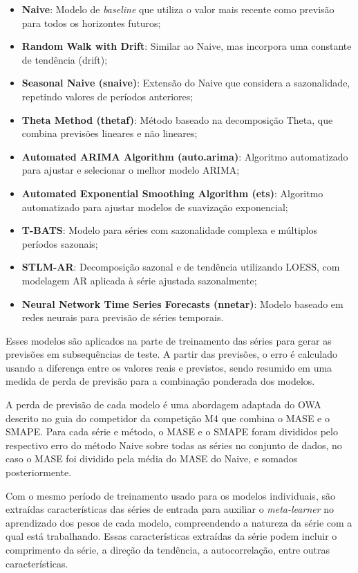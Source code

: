 \begin{itemize}
\label{pool_models}
    \item \textbf{Naive}: Modelo de \textit{baseline} que utiliza o valor mais recente como previsão para todos os horizontes futuros;
    \item \textbf{Random Walk with Drift}: Similar ao Naive, mas incorpora uma constante de tendência (drift);
    \item \textbf{Seasonal Naive (snaive)}: Extensão do Naive que considera a sazonalidade, repetindo valores de períodos anteriores;
    \item \textbf{Theta Method (thetaf)}: Método baseado na decomposição Theta, que combina previsões lineares e não lineares;
    \item \textbf{Automated ARIMA Algorithm (auto.arima)}: Algoritmo automatizado para ajustar e selecionar o melhor modelo ARIMA;
    \item \textbf{Automated Exponential Smoothing Algorithm (ets)}: Algoritmo automatizado para ajustar modelos de suavização exponencial;
    \item \textbf{T-BATS}: Modelo para séries com sazonalidade complexa e múltiplos períodos sazonais;
    \item \textbf{STLM-AR}: Decomposição sazonal e de tendência utilizando LOESS, com modelagem AR aplicada à série ajustada sazonalmente;
    \item \textbf{Neural Network Time Series Forecasts (nnetar)}: Modelo baseado em redes neurais para previsão de séries temporais.
\end{itemize}

Esses modelos são aplicados na parte de treinamento das séries para gerar as previsões em subsequências de teste. A partir das previsões, o erro é calculado usando a diferença entre os valores reais e previstos, sendo resumido em uma medida de perda de previsão para a combinação ponderada dos modelos.

A perda de previsão de cada modelo é uma abordagem adaptada do OWA descrito no guia do competidor da competição M4 \cite{m4competition} que combina o MASE e o SMAPE. Para cada série e método, o MASE e o SMAPE foram divididos pelo respectivo erro do método Naive sobre todas as séries no conjunto de dados, no caso o MASE foi dividido pela média do MASE do Naive, e somados posteriormente.

Com o mesmo período de treinamento usado para os modelos individuais, são extraídas características das séries de entrada para auxiliar o \textit{meta-learner} no aprendizado dos pesos de cada modelo, compreendendo a natureza da série com a qual está trabalhando. Essas características extraídas da série podem incluir o comprimento da série, a direção da tendência, a autocorrelação, entre outras características.

